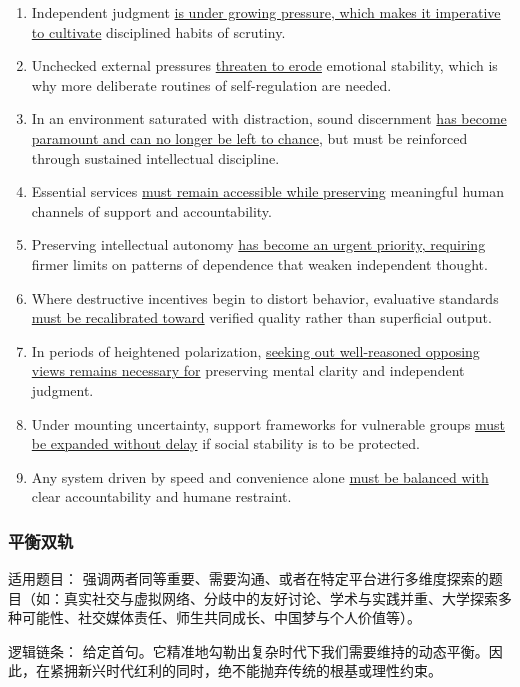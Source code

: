 \begin{enumerate}
    \item Independent judgment \underline{is under growing pressure, which makes it imperative to cultivate} disciplined habits of scrutiny.
    \item Unchecked external pressures \underline{threaten to erode} emotional stability, which is why more deliberate routines of self-regulation are needed.
    \item In an environment saturated with distraction, sound discernment \underline{has become paramount and can no longer be left to chance}, but must be reinforced through sustained intellectual discipline.
    \item Essential services \underline{must remain accessible while preserving} meaningful human channels of support and accountability.
    \item Preserving intellectual autonomy \underline{has become an urgent priority, requiring} firmer limits on patterns of dependence that weaken independent thought.
    \item Where destructive incentives begin to distort behavior, evaluative standards \underline{must be recalibrated toward} verified quality rather than superficial output.
    \item In periods of heightened polarization, \underline{seeking out well-reasoned opposing views remains necessary for} preserving mental clarity and independent judgment.
    \item Under mounting uncertainty, support frameworks for vulnerable groups \underline{must be expanded without delay} if social stability is to be protected.
    \item Any system driven by speed and convenience alone \underline{must be balanced with} clear accountability and humane restraint.
\end{enumerate}

\subsubsection{平衡双轨}

适用题目： 强调两者同等重要、需要沟通、或者在特定平台进行多维度探索的题目（如：真实社交与虚拟网络、分歧中的友好讨论、学术与实践并重、大学探索多种可能性、社交媒体责任、师生共同成长、中国梦与个人价值等）。

逻辑链条： 给定首句。它精准地勾勒出复杂时代下我们需要维持的动态平衡。因此，在紧拥新兴时代红利的同时，绝不能抛弃传统的根基或理性约束。

